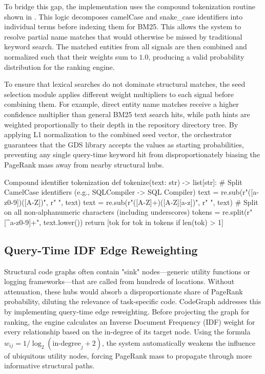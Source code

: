 To bridge this gap, the implementation uses the compound tokenization routine shown in . This logic decomposes camelCase and snake\_case identifiers into individual terms before indexing them for BM25. This allows the system to resolve partial name matches that would otherwise be missed by traditional keyword search. The matched entities from all signals are then combined and normalized such that their weights sum to $1.0$, producing a valid probability distribution for the ranking engine.

To ensure that lexical searches do not dominate structural matches, the seed selection module applies different weight multipliers to each signal before combining them. For example, direct entity name matches receive a higher confidence multiplier than general BM25 text search hits, while path hints are weighted proportionally to their depth in the repository directory tree. By applying L1 normalization to the combined seed vector, the orchestrator guarantees that the GDS library accepts the values as starting probabilities, preventing any single query-time keyword hit from disproportionately biasing the PageRank mass away from nearby structural hubs.

\begin{cgpython}[label=lst:compound-tokenize, unbreakable]{Compound identifier tokenization}
def tokenize(text: str) -> list[str]:
    # Split CamelCase identifiers (e.g., SQLCompiler -> SQL Compiler)
    text = re.sub(r"([a-z0-9])([A-Z])", r"\1 \2", text)
    text = re.sub(r"([A-Z]+)([A-Z][a-z])", r"\1 \2", text)
    # Split on all non-alphanumeric characters (including underscores)
    tokens = re.split(r"[^a-z0-9]+", text.lower())
    return [tok for tok in tokens if len(tok) > 1]
\end{cgpython}

\subsection{Query-Time IDF Edge Reweighting}
\label{subsec:idf-reweighting}

Structural code graphs often contain "sink" nodes—generic utility functions or logging frameworks—that are called from hundreds of locations. Without attenuation, these hubs would absorb a disproportionate share of PageRank probability, diluting the relevance of task-specific code. CodeGraph addresses this by implementing query-time edge reweighting. Before projecting the graph for ranking, the engine calculates an Inverse Document Frequency (IDF) weight for every relationship based on the in-degree of its target node. Using the formula $w_{ij} = 1 / \log_2(\text{in-degree}_j + 2)$, the system automatically weakens the influence of ubiquitous utility nodes, forcing PageRank mass to propagate through more informative structural paths.


